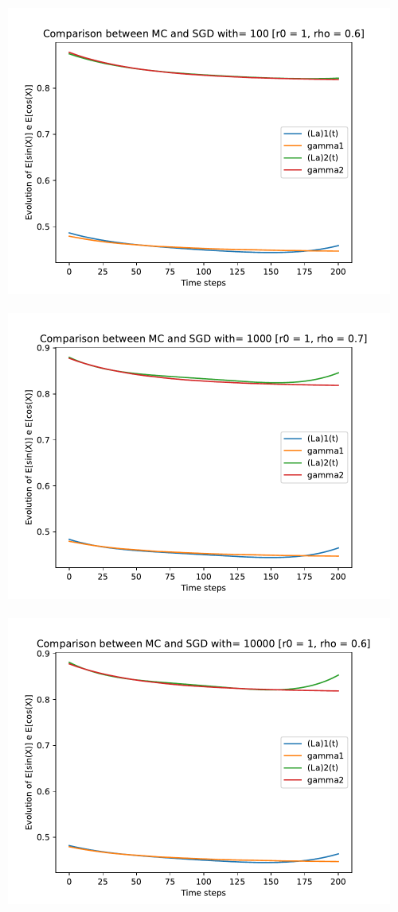 \documentclass[a4paper,11pt,openright]{report}
\begin{document}
\begin{figure}[H]
\centering
\includegraphics[width=0.9\textwidth]{images/graphs T = 2/n = 4, M = 100 sine and cosine.pdf}
\end{figure}
\begin{figure}[H]
\centering
\includegraphics[width=0.9\textwidth]{images/graphs T = 2/n = 4, M = 1000 sine and cosine.pdf}
\end{figure}
\begin{figure}[H]
\centering
\includegraphics[width=0.9\textwidth]{images/graphs T = 2/n = 4, M = 10000 sine and cosine.pdf}
\end{figure}
\newpage
\end{document}
